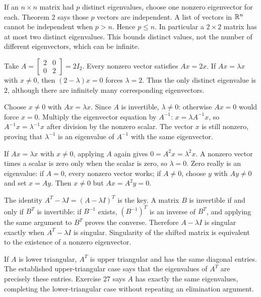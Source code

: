 If an $n\times n$ matrix had $p$ distinct eigenvalues, choose one
nonzero eigenvector for each. Theorem 2 says those $p$ vectors are
independent. A list of vectors in $\mathbb{R}^n$ cannot be independent when
$p>n$. Hence $p\le n$. In particular a $2\times2$ matrix has at
most two distinct eigenvalues. This bounds distinct values, not the
number of different eigenvectors, which can be infinite.

Take $A=\begin{bmatrix}2&0\\0&2\end{bmatrix}=2I_2$.
Every nonzero vector satisfies $Ax=2x$. If $Ax=\lambda x$
with $x\ne0$, then $(2-\lambda)x=0$ forces $\lambda=2$.
Thus the only distinct eigenvalue is $2$, although there are infinitely
many corresponding eigenvectors.

Choose $x\ne0$ with $Ax=\lambda x$. Since $A$ is invertible,
$\lambda\ne0$: otherwise $Ax=0$ would force $x=0$.
Multiply the eigenvector equation by $A^{-1}$:
$x=\lambda A^{-1}x$, so
$A^{-1}x=\lambda^{-1}x$ after division by the nonzero scalar.
The vector $x$ is still nonzero, proving that $\lambda^{-1}$ is an
eigenvalue of $A^{-1}$ with the same eigenvector.

If $Ax=\lambda x$ with $x\ne0$, applying $A$ again gives
$0=A^2x=\lambda^2x$. A nonzero vector times a scalar is zero
only when the scalar is zero, so $\lambda=0$.
Zero really is an eigenvalue: if $A=0$, every nonzero vector works;
if $A\ne0$, choose $y$ with $Ay\ne0$ and set $x=Ay$.
Then $x\ne0$ but $Ax=A^2y=0$.

The identity $A^T-\lambda I=(A-\lambda I)^T$ is the key.
A matrix $B$ is invertible if and only if $B^T$ is invertible:
if $B^{-1}$ exists, $(B^{-1})^T$ is an inverse of $B^T$,
and applying the same argument to $B^T$ proves the converse.
Therefore $A-\lambda I$ is singular exactly when
$A^T-\lambda I$ is singular. Singularity of the shifted matrix
is equivalent to the existence of a nonzero eigenvector.

If $A$ is lower triangular, $A^T$ is upper triangular and has
the same diagonal entries. The established upper-triangular case says
that the eigenvalues of $A^T$ are precisely these entries.
Exercise 27 says $A$ has exactly the same eigenvalues, completing
the lower-triangular case without repeating an elimination argument.

